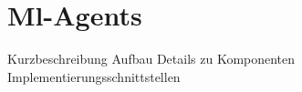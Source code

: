 {\chapter{Ml-Agents}}
\label{sec:mlagents}
Kurzbeschreibung
Aufbau
Details zu Komponenten
Implementierungsschnittstellen